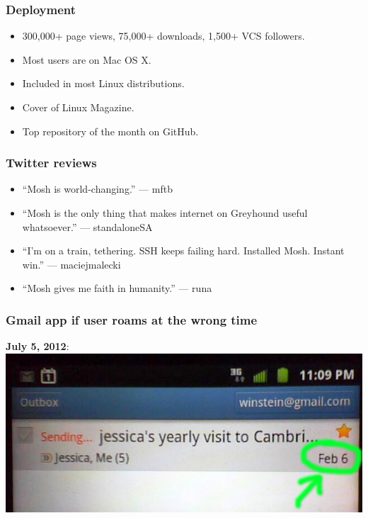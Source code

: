 \documentclass[svgnames]{beamer}
\begin{document}
\begin{frame}
\frametitle{Deployment}

\begin{itemize}
\item 300,000+ page views, 75,000+ downloads, 1,500+ VCS followers.

\item Most users are on Mac OS X.

\item Included in most Linux distributions.

\item Cover of Linux Magazine.

\item Top repository of the month on GitHub.

\end{itemize}

\end{frame}

\begin{frame}
\frametitle{Twitter reviews}

\begin{itemize}
\item ``Mosh is world-changing.'' --- mftb

\item ``Mosh is the only thing that makes internet on Greyhound useful
whatsoever.'' --- standaloneSA

\item ``I'm on a train, tethering. SSH keeps failing hard. Installed
  Mosh. Instant win.'' --- maciejmalecki

\item ``Mosh gives me faith in humanity.'' --- runa

\end{itemize}

\end{frame}

\begin{frame}
\frametitle{Gmail app if user roams at the wrong time}

\textbf{July 5, 2012}:\\
\includegraphics[scale=.5]{gmail.png}

\end{frame}
\end{document}
